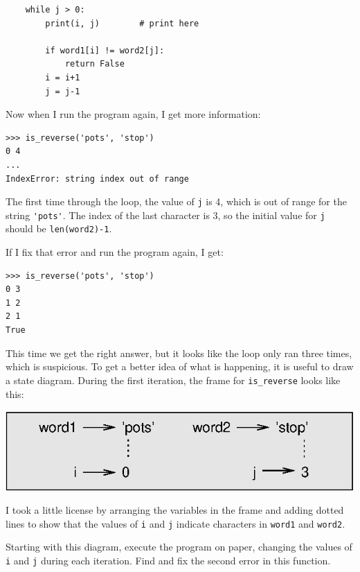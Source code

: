 \documentclass[10pt]{book}
\begin{document}
\beforeverb
\begin{verbatim}
    while j > 0:
        print(i, j)        # print here
        
        if word1[i] != word2[j]:
            return False
        i = i+1
        j = j-1
\end{verbatim}
\afterverb
%
Now when I run the program again, I get more information:

\beforeverb
\begin{verbatim}
>>> is_reverse('pots', 'stop')
0 4
...
IndexError: string index out of range
\end{verbatim}
\afterverb
%
The first time through the loop, the value of {\tt j} is 4,
which is out of range for the string \verb"'pots'".
The index of the last character is 3, so the
initial value for {\tt j} should be {\tt len(word2)-1}.


If I fix that error and run the program again, I get:

\beforeverb
\begin{verbatim}
>>> is_reverse('pots', 'stop')
0 3
1 2
2 1
True
\end{verbatim}
\afterverb
%
This time we get the right answer, but it looks like the loop only ran
three times, which is suspicious.  To get a better idea of what is
happening, it is useful to draw a state diagram.  During the first
iteration, the frame for \verb"is_reverse" looks like this:


\beforefig
\centerline{\includegraphics{figs/state4.eps}}
\afterfig

I took a little license by arranging the variables in the frame
and adding dotted lines to show that the values of {\tt i} and
{\tt j} indicate characters in {\tt word1} and {\tt word2}.

\begin{ex}
\label{is_reverse}
Starting with this diagram, execute the program on paper, changing the
values of {\tt i} and {\tt j} during each iteration.  Find and fix the
second error in this function.
\end{ex}
\end{document}
